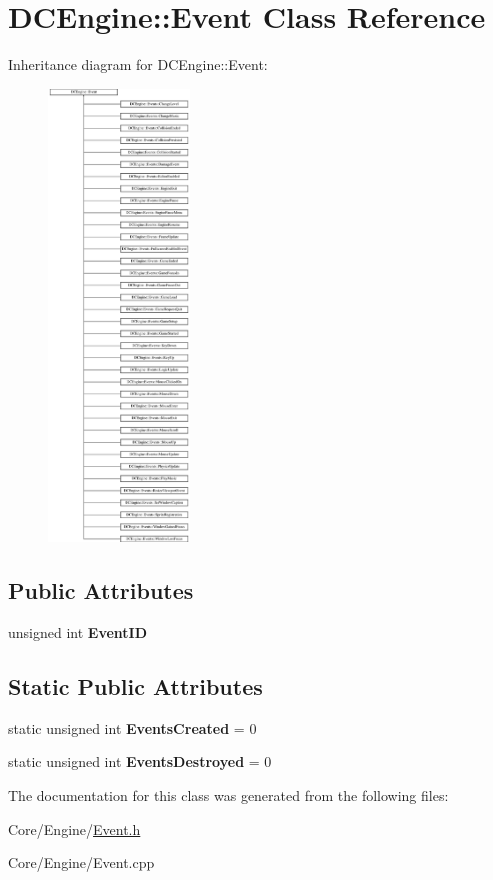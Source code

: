 \hypertarget{classDCEngine_1_1Event}{\section{D\-C\-Engine\-:\-:Event Class Reference}
\label{classDCEngine_1_1Event}
}
Inheritance diagram for D\-C\-Engine\-:\-:Event\-:\begin{figure}[H]
\begin{center}
\leavevmode
\includegraphics[height=12.000000cm]{classDCEngine_1_1Event}
\end{center}
\end{figure}
\subsection*{Public Attributes}
\begin{DoxyCompactItemize}
\item 
\hypertarget{classDCEngine_1_1Event_a52007e10cad827ba88cb5c92a34c01f9}{unsigned int {\bfseries Event\-I\-D}}\label{classDCEngine_1_1Event_a52007e10cad827ba88cb5c92a34c01f9}

\end{DoxyCompactItemize}
\subsection*{Static Public Attributes}
\begin{DoxyCompactItemize}
\item 
\hypertarget{classDCEngine_1_1Event_a3daf3a27f0717f4ba7e3cd04b5a62f3a}{static unsigned int {\bfseries Events\-Created} = 0}\label{classDCEngine_1_1Event_a3daf3a27f0717f4ba7e3cd04b5a62f3a}

\item 
\hypertarget{classDCEngine_1_1Event_a6ccaf7b6c6b327b89daa0e60ab5f99a5}{static unsigned int {\bfseries Events\-Destroyed} = 0}\label{classDCEngine_1_1Event_a6ccaf7b6c6b327b89daa0e60ab5f99a5}

\end{DoxyCompactItemize}


The documentation for this class was generated from the following files\-:\begin{DoxyCompactItemize}
\item 
Core/\-Engine/\hyperlink{Event_8h}{Event.\-h}\item 
Core/\-Engine/Event.\-cpp\end{DoxyCompactItemize}
